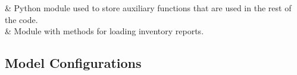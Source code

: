 \documentclass[letterpaper,10pt,english]{sphinxmanual}
\begin{document}
\begin{savenotes}\sphinxatlongtablestart\begin{longtable}[c]{}
\hline

\endfirsthead

%
{}\\
\hline

\endhead

\hline
{}\\
\endfoot

\endlastfoot

{\hyperref[\detokenize{source/optimization.opt_tools:module-optimization.opt_tools.aux_funcs}]{}}
&
Python module used to store auxiliary functions that are used in the rest of the code.
\\
\hline
{\hyperref[\detokenize{source/optimization.opt_tools:module-optimization.opt_tools.load_data}]{}}
&
Module with methods for loading inventory reports.
\\
\hline
\end{longtable}\sphinxatlongtableend\end{savenotes}


\subsection{Model Configurations}
\label{\detokenize{source/optimization.configuration:model-configurations}}\label{\detokenize{source/optimization.configuration::doc}}
\end{document}
